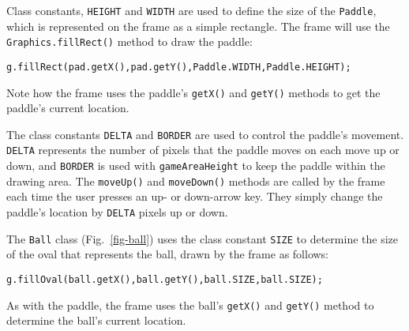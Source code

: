 Class constants, {\tt HEIGHT} and {\tt WIDTH} are used to
define the size of the {\tt Paddle}, which is represented on
the frame as a simple rectangle. The frame will use the
{\tt Graphics.fillRect()} method  to draw the paddle:

\begin{jjjlisting}[28pc]
\begin{lstlisting}
g.fillRect(pad.getX(),pad.getY(),Paddle.WIDTH,Paddle.HEIGHT);
\end{lstlisting}
\end{jjjlisting}

\noindent Note how the frame uses the paddle's {\tt getX()}
and {\tt getY()} methods to get the paddle's current location. 


The class constants {\tt DELTA} and {\tt BORDER} are used to control
the paddle's movement. {\tt DELTA} represents the number of pixels
that the paddle moves on each move up or down, and {\tt BORDER} is
used with {\tt gameAreaHeight} to keep the paddle within the
drawing area.  The {\tt moveUp()} and {\tt moveDown()} methods are
called by the frame each time the user presses an up- or down-arrow key.
They simply change the paddle's location by {\tt DELTA} pixels up or
down.

\pagebreak
The {\tt Ball} class (Fig.~\ref{fig-ball}) uses the class constant
{\tt SIZE} to determine the size of the oval that represents the ball,
drawn by the frame as follows:

\begin{jjjlisting}
\begin{lstlisting}
g.fillOval(ball.getX(),ball.getY(),ball.SIZE,ball.SIZE);
\end{lstlisting}
\end{jjjlisting}

\noindent As with the paddle, the frame uses the
ball's {\tt getX()} and {\tt getY()} method to determine the ball's
current location.


